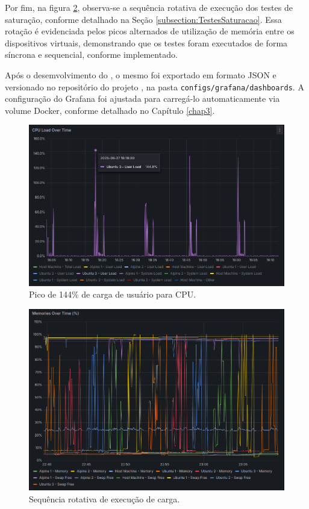 Por fim, na figura \ref{fig:roundrobin}, observa-se a sequência rotativa de execução dos testes de saturação, conforme detalhado na Seção \ref{subsection:TestesSaturacao}. Essa rotação é evidenciada pelos picos alternados de utilização de memória entre os dispositivos virtuais, demonstrando que os testes foram executados de forma síncrona e sequencial, conforme implementado.

Após o desemvolvimento do , o mesmo foi exportado em formato JSON e versionado no repositório do projeto \citep{vitorcossetti2025}, na pasta \verb|configs/grafana/dashboards|. A configuração do Grafana foi ajustada para carregá-lo automaticamente via volume Docker, conforme detalhado no Capítulo \ref{chap3}.

\begin{figure}[H]
\centering
\setlength{\abovecaptionskip}{-20pt}
\includegraphics[width=\textwidth]{Imagens/chap04/dashboard/cpu144.png}
\caption{Pico de 144\% de carga de usuário para CPU.}
\label{fig:dashboard-cpu144}
\end{figure}

\begin{figure}[H]
\centering
\setlength{\abovecaptionskip}{-20pt}
\includegraphics[width=\textwidth]{Imagens/chap04/dashboard/round_robin_sequence.png}
\caption{Sequência rotativa de execução de carga.}
\label{fig:roundrobin}
\end{figure}

